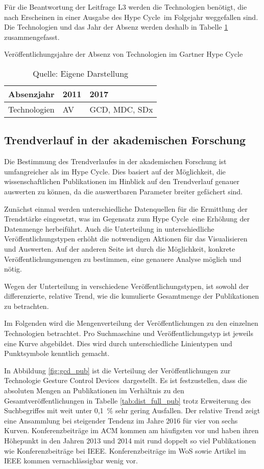 Für die Beantwortung der Leitfrage L3 werden die Technologien benötigt, die nach Erscheinen in einer Ausgabe des \glqq Hype Cycle\grqq~im Folgejahr weggefallen sind. Die Technologien und das Jahr der Absenz werden deshalb in Tabelle \ref{tab:ghc_abscence} zusammengefasst.

\begin{table}
	\caption{Veröffentlichungsjahre der Absenz von Technologien im \glqq Gartner Hype Cycle\grqq}
	\selectfont
	\centering
	\label{tab:ghc_abscence}
	\begin{tabularx}{\linewidth}{X|XX}
		Absenzjahr & 2011 & 2017  \\
		\hline
		Technologien & \acs{AV} & \acs{GCD}, \acs{MDC}, \acs{SDx} \\
	\end{tabularx}
	\caption*{Quelle: Eigene Darstellung}
\end{table}

\subsection{Trendverlauf in der akademischen Forschung}
Die Bestimmung des Trendverlaufes in der akademischen Forschung ist umfangreicher als im \glqq Hype Cycle\grqq. Dies basiert auf der Möglichkeit, die wissenschaftlichen Publikationen im Hinblick auf den Trendverlauf genauer auswerten zu können, da die auswertbaren Parameter breiter gefächert sind.

Zunächst einmal werden unterschiedliche Datenquellen für die Ermittlung der Trend\-stär\-ke eingesetzt, was im Ge\-gen\-satz zum \glqq Hype Cycle\grqq~eine Er\-hö\-hung der Datenmenge herbeiführt. Auch die Unterteilung in unterschiedliche Veröffentlichungstypen erhöht die notwendigen Aktionen für das Visualisieren und Auswerten. Auf der anderen Seite ist durch die Möglichkeit, konkrete Veröffentlichungsmengen zu bestimmen, eine genauere Analyse möglich und nötig.

Wegen der Unterteilung in verschiedene Veröffentlichungstypen, ist sowohl der differenzierte, relative Trend, wie die kumulierte Gesamtmenge der Publikationen zu betrachten.

Im Folgenden wird die Mengenverteilung der Veröffentlichungen zu den einzelnen Technologien betrachtet. Pro Suchmaschine und Veröffentlichungstyp ist jeweils eine Kurve abgebildet. Dies wird durch unterschiedliche Linientypen und Punktsymbole kenntlich gemacht.

In Abbildung \ref{fig:gcd_pub} ist die Verteilung der Veröffentlichungen zur Technologie \glqq Gesture Control Devices\grqq~dargestellt. Es ist festzustellen, dass die absoluten Mengen an Publikationen im Verhältnis zu den Gesamtveröffentlichungen in Tabelle \ref{tab:dist_full_pub} trotz Erweiterung des Suchbegriffes mit weit unter 0,1~\% sehr gering Ausfallen. Der relative Trend zeigt eine Ansammlung bei steigender Tendenz im Jahre 2016 für vier von sechs Kurven. Konferenzbeiträge im \ac{ACM} kommen am häufigsten vor und haben ihren Höhepunkt in den Jahren 2013 und 2014 mit rund doppelt so viel Publikationen wie Konferenzbeiträge bei \ac{IEEE}. Konferenzbeiträge im \ac{WoS} sowie Artikel im \ac{IEEE} kommen vernachlässigbar wenig vor.

